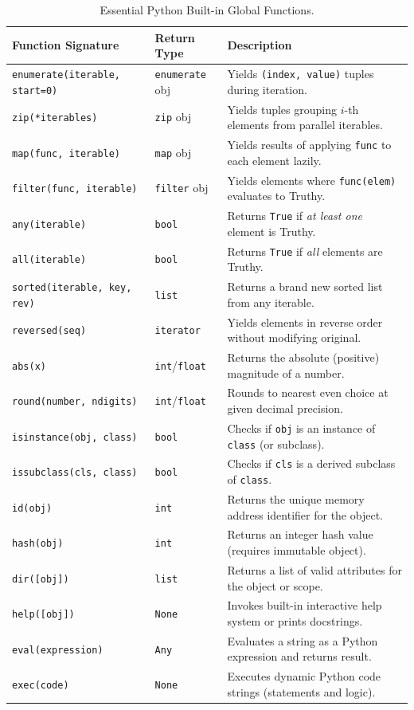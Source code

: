 \begin{table}[htbp]
\centering
\small
\renewcommand{\arraystretch}{1.2}
\begin{tabularx}{\linewidth}{ll>{\raggedright\arraybackslash}X}
\toprule
\textbf{Function Signature} & \textbf{Return Type} & \textbf{Description} \\
\midrule
\texttt{enumerate(iterable, start=0)} & \texttt{enumerate} obj & Yields \texttt{(index, value)} tuples during iteration. \\
\texttt{zip(*iterables)} & \texttt{zip} obj & Yields tuples grouping $i$-th elements from parallel iterables. \\
\texttt{map(func, iterable)} & \texttt{map} obj & Yields results of applying \texttt{func} to each element lazily. \\
\texttt{filter(func, iterable)} & \texttt{filter} obj & Yields elements where \texttt{func(elem)} evaluates to Truthy. \\
\texttt{any(iterable)} & \texttt{bool} & Returns \texttt{True} if \textit{at least one} element is Truthy. \\
\texttt{all(iterable)} & \texttt{bool} & Returns \texttt{True} if \textit{all} elements are Truthy. \\
\texttt{sorted(iterable, key, rev)} & \texttt{list} & Returns a brand new sorted list from any iterable. \\
\texttt{reversed(seq)} & \texttt{iterator} & Yields elements in reverse order without modifying original. \\
\texttt{abs(x)} & \texttt{int}/\texttt{float} & Returns the absolute (positive) magnitude of a number. \\
\texttt{round(number, ndigits)} & \texttt{int}/\texttt{float} & Rounds to nearest even choice at given decimal precision. \\
\texttt{isinstance(obj, class)} & \texttt{bool} & Checks if \texttt{obj} is an instance of \texttt{class} (or subclass). \\
\texttt{issubclass(cls, class)} & \texttt{bool} & Checks if \texttt{cls} is a derived subclass of \texttt{class}. \\
\texttt{id(obj)} & \texttt{int} & Returns the unique memory address identifier for the object. \\
\texttt{hash(obj)} & \texttt{int} & Returns an integer hash value (requires immutable object). \\
\texttt{dir([obj])} & \texttt{list} & Returns a list of valid attributes for the object or scope. \\
\texttt{help([obj])} & \texttt{None} & Invokes built-in interactive help system or prints docstrings. \\
\texttt{eval(expression)} & \texttt{Any} & Evaluates a string as a Python expression and returns result. \\
\texttt{exec(code)} & \texttt{None} & Executes dynamic Python code strings (statements and logic). \\
\bottomrule
\end{tabularx}
\caption{Essential Python Built-in Global Functions.}
\label{tab:master-builtins}
\end{table}

